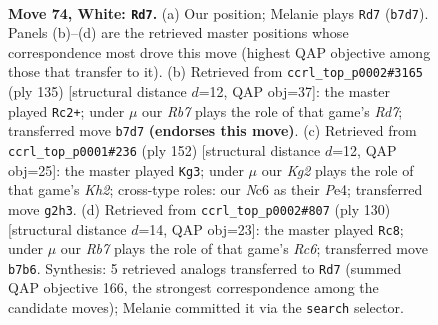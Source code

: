 \documentclass[11pt]{article}
\begin{document}
\clearpage

\begin{figure}[p]\centering
\begin{subfigure}{0.46\textwidth}\centering
\resizebox{\linewidth}{!}{%
\newchessgame
\chessboard[
  setfen={6k1/1R4p1/2N2p2/7p/3P3P/r5P1/6K1/8 w - - 41 74},
  showmover=false,
  pgfstyle=straightmove, color=movearrow, markmove={b7-d7}
]}
\caption{}
\end{subfigure}\hfill
\begin{subfigure}{0.46\textwidth}\centering
\resizebox{\linewidth}{!}{%
\newchessgame
\chessboard[
  setfen={6R1/8/3P4/2K2kp1/5p1p/7P/3r2P1/8 b - - 7 68},
  showmover=false,
  pgfstyle=straightmove, color=movearrow, markmove={d2-c2}
]}
\caption{}
\end{subfigure}
\\[4pt]
\begin{subfigure}{0.46\textwidth}\centering
\resizebox{\linewidth}{!}{%
\newchessgame
\chessboard[
  setfen={8/5k2/R5p1/4p2p/4P2P/5P2/6PK/2r5 w - - 73 77},
  showmover=false,
  pgfstyle=straightmove, color=movearrow, markmove={h2-g3}
]}
\caption{}
\end{subfigure}\hfill
\begin{subfigure}{0.46\textwidth}\centering
\resizebox{\linewidth}{!}{%
\newchessgame
\chessboard[
  setfen={8/6k1/2R3p1/7p/7P/6P1/5P1K/1r6 w - - 15 66},
  showmover=false,
  pgfstyle=straightmove, color=movearrow, markmove={c6-c8}
]}
\caption{}
\end{subfigure}
\caption{\textbf{Move 74, White: \texttt{Rd7}.} (a) Our position; Melanie plays \texttt{Rd7} (\texttt{b7d7}). Panels (b)--(d) are the retrieved master positions whose correspondence most drove this move (highest QAP objective among those that transfer to it). (b) Retrieved from \texttt{ccrl\_top\_p0002\#3165} (ply 135) [structural distance $d$=12, QAP obj=37]: the master played \texttt{Rc2+}; under $\mu$ our \emph{Rb7} plays the role of that game's \emph{Rd7}; transferred move \texttt{b7d7} \textbf{(endorses this move)}. (c) Retrieved from \texttt{ccrl\_top\_p0001\#236} (ply 152) [structural distance $d$=12, QAP obj=25]: the master played \texttt{Kg3}; under $\mu$ our \emph{Kg2} plays the role of that game's \emph{Kh2}; cross-type roles: our \emph{N}c6 as their \emph{P}e4; transferred move \texttt{g2h3}. (d) Retrieved from \texttt{ccrl\_top\_p0002\#807} (ply 130) [structural distance $d$=14, QAP obj=23]: the master played \texttt{Rc8}; under $\mu$ our \emph{Rb7} plays the role of that game's \emph{Rc6}; transferred move \texttt{b7b6}. Synthesis: 5 retrieved analogs transferred to \texttt{Rd7} (summed QAP objective 166, the strongest correspondence among the candidate moves); Melanie committed it via the \texttt{search} selector.}
\label{fig:thought-m146}
\end{figure}
\end{document}
